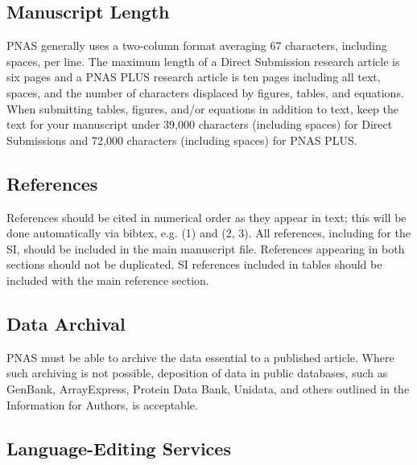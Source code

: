 \documentclass[9pt,twocolumn,twoside,]{pnas-new}
\begin{document}
\hypertarget{manuscript-length}{%
\subsection*{Manuscript Length}\label{manuscript-length}}

PNAS generally uses a two-column format averaging 67 characters,
including spaces, per line. The maximum length of a Direct Submission
research article is six pages and a PNAS PLUS research article is ten
pages including all text, spaces, and the number of characters displaced
by figures, tables, and equations. When submitting tables, figures,
and/or equations in addition to text, keep the text for your manuscript
under 39,000 characters (including spaces) for Direct Submissions and
72,000 characters (including spaces) for PNAS PLUS.

\hypertarget{references}{%
\subsection*{References}\label{references}}

References should be cited in numerical order as they appear in text;
this will be done automatically via bibtex, e.g. (1) and (2, 3). All
references, including for the SI, should be included in the main
manuscript file. References appearing in both sections should not be
duplicated. SI references included in tables should be included with the
main reference section.

\hypertarget{data-archival}{%
\subsection*{Data Archival}\label{data-archival}}

PNAS must be able to archive the data essential to a published article.
Where such archiving is not possible, deposition of data in public
databases, such as GenBank, ArrayExpress, Protein Data Bank, Unidata,
and others outlined in the Information for Authors, is acceptable.

\hypertarget{language-editing-services}{%
\subsection*{Language-Editing
Services}\label{language-editing-services}}
\end{document}
